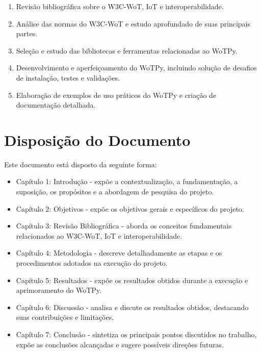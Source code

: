 \begin{enumerate}
\item Revisão bibliográfica sobre o W3C-WoT, IoT e interoperabilidade.
\item Análise das normas do W3C-WoT e estudo aprofundado de suas principais partes.
\item Seleção e estudo das bibliotecas e ferramentas relacionadas ao WoTPy.
\item Desenvolvimento e aperfeiçoamento do WoTPy, incluindo solução de desafios de instalação, testes e validações.
\item Elaboração de exemplos de uso práticos do WoTPy e criação de documentação detalhada.
\end{enumerate}

\section{Disposição do Documento}

Este documento está disposto da seguinte forma:

\begin{itemize}
\item Capítulo 1: Introdução - expõe a contextualização, a fundamentação, a suposição, os propósitos e a abordagem de pesquisa do projeto.
\item Capítulo 2: Objetivos - expõe os objetivos gerais e específicos do projeto.
\item Capítulo 3: Revisão Bibliográfica - aborda os conceitos fundamentais relacionados ao W3C-WoT, IoT e interoperabilidade.
\item Capítulo 4: Metodologia - descreve detalhadamente as etapas e os procedimentos adotados na execução do projeto.
\item Capítulo 5: Resultados - expõe os resultados obtidos durante a execução e aprimoramento do WoTPy.
\item Capítulo 6: Discussão - analisa e discute os resultados obtidos, destacando suas contribuições e limitações.
\item Capítulo 7: Conclusão - sintetiza os principais pontos discutidos no trabalho, expõe as conclusões alcançadas e sugere possíveis direções futuras.
\end{itemize}